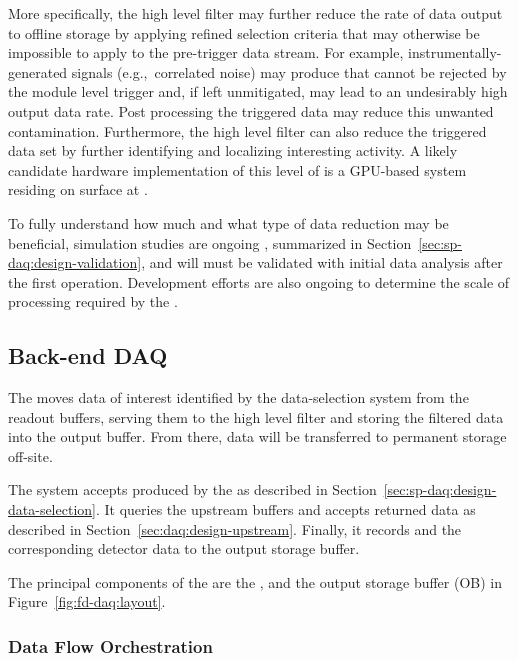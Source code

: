 More specifically, the high level filter may further reduce the rate of data output to offline storage by
applying refined selection criteria that may otherwise be impossible
to apply to the pre-trigger data stream.  For example, instrumentally-generated signals (e.g.,~correlated noise)
may produce  that cannot be rejected by the module
level trigger and, if left unmitigated, may lead to an undesirably high
output data rate. 
Post processing the triggered data may reduce this unwanted
contamination.
Furthermore, the high level filter can also reduce the triggered data set by further identifying
and localizing interesting activity. A likely candidate hardware
implementation of this level of  is a GPU-based system
residing on surface at .

To fully understand how much and what type of data reduction may be
beneficial, simulation studies are ongoing \cite{bib:docdb11311},
summarized in Section~\ref{sec:sp-daq:design-validation}, and will
must be
validated with initial data analysis after the
first   operation. Development efforts are also ongoing to determine the scale of 
processing required by the .


\subsection{Back-end DAQ}
\label{sec:fd-daq:design-backend}

The   moves data of interest identified by the data-selection system from the readout  buffers, serving them to the high level filter and storing the filtered data into the output buffer. From there, data will be transferred to permanent storage off-site.

The  system accepts  produced by the  as described
in Section~\ref{sec:sp-daq:design-data-selection}.  It queries the upstream  buffers and
accepts returned data as described in Section~\ref{sec:daq:design-upstream}. Finally, it records
 and the corresponding detector data to the output storage buffer.

The principal components of the  are the ,  and the output
storage buffer (OB) in Figure~\ref{fig:fd-daq:layout}.

\subsubsection{Data Flow Orchestration}

